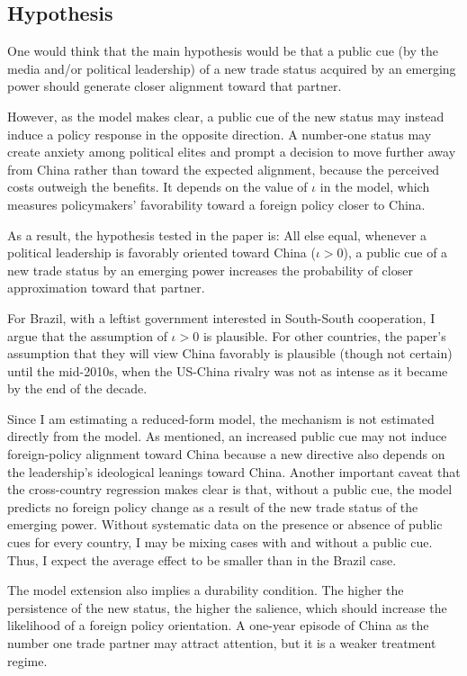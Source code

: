 \documentclass[referee,pdflatex,sn-basic]{sn-jnl}
\theoremstyle{thmstylethree}
\begin{document}
\subsection{Hypothesis}\label{hypothesis}

One would think that the main hypothesis would be that a public cue (by the media and/or political leadership) of a new trade status acquired by an emerging power should generate closer alignment toward that partner.

However, as the model makes clear, a public cue of the new status may instead induce a policy response in the opposite direction. A number-one status may create anxiety among political elites and prompt a decision to move further away from China rather than toward the expected alignment, because the perceived costs outweigh the benefits. It depends on the value of \(\iota\) in the model, which measures policymakers' favorability toward a foreign policy closer to China.

As a result, the hypothesis tested in the paper is: All else equal, whenever a political leadership is favorably oriented toward China (\(\iota>0\)), a public cue of a new trade status by an emerging power increases the probability of closer approximation toward that partner.

For Brazil, with a leftist government interested in South-South cooperation, I argue that the assumption of \(\iota>0\) is plausible. For other countries, the paper's assumption that they will view China favorably is plausible (though not certain) until the mid-2010s, when the US-China rivalry was not as intense as it became by the end of the decade.

Since I am estimating a reduced-form model, the mechanism is not estimated directly from the model. As mentioned, an increased public cue may not induce foreign-policy alignment toward China because a new directive also depends on the leadership's ideological leanings toward China. Another important caveat that the cross-country regression makes clear is that, without a public cue, the model predicts no foreign policy change as a result of the new trade status of the emerging power. Without systematic data on the presence or absence of public cues for every country, I may be mixing cases with and without a public cue. Thus, I expect the average effect to be smaller than in the Brazil case.

The model extension also implies a durability condition. The higher the persistence of the new status, the higher the salience, which should increase the likelihood of a foreign policy orientation. A one-year episode of China as the number one trade partner may attract attention, but it is a weaker treatment regime.
\end{document}
